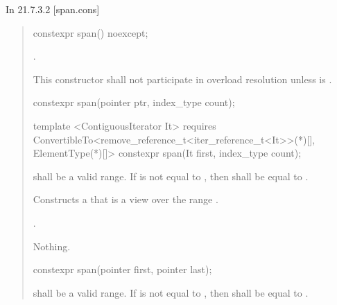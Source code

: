 \documentclass{wg21}
\begin{document}
In 21.7.3.2 [span.cons]

\begin{quote}


\begin{itemdecl}
	constexpr span() noexcept;
\end{itemdecl}
\begin{itemdescr}
	\pnum
	\ensures
	.

	\pnum
	\remarks
	This constructor shall not participate in overload resolution
	unless  is .
\end{itemdescr}
\begin{removedblock}
\begin{itemdecl}
constexpr span(pointer ptr, index_type count);
\end{itemdecl}
\end{removedblock}
\begin{addedblock}
\begin{itemdecl}
template <ContiguousIterator It>
requires ConvertibleTo<remove_reference_t<iter_reference_t<It>>(*)[], ElementType(*)[]>
constexpr span(It first, index_type count);
\end{itemdecl}
\end{addedblock}
\begin{itemdescr}
	\pnum
	\requires {} shall be a valid range.
	If  is not equal to ,
	then  shall be equal to .

	\pnum
	\effects
	Constructs a  that is a view over the range .

	\pnum
	\ensures
	.

	\pnum
	\throws
	Nothing.
\end{itemdescr}


\begin{removedblock}
\begin{itemdecl}
constexpr span(pointer first, pointer last);
\end{itemdecl}
\end{removedblock}
\begin{removedblock}

\begin{itemdescr}
	\pnum
	\requires
	 shall be a valid range.
	If  is not equal to ,
	then  shall be equal to .


\end{itemdescr}
\end{removedblock}
\end{quote}
\end{document}
